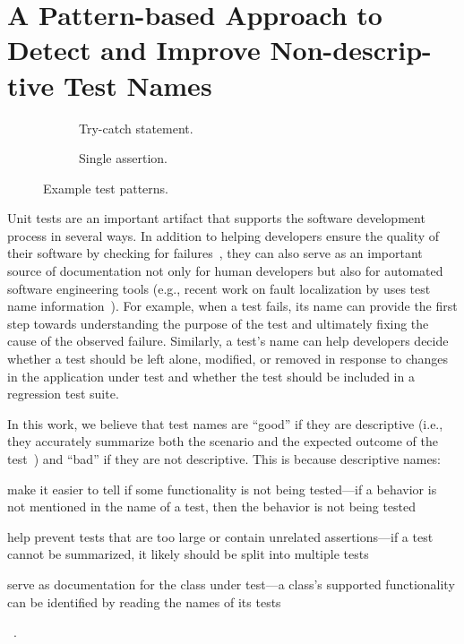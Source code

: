 \documentclass[proposal.tex]{subfiles}
\begin{document}
\section{A Pattern-based Approach to Detect and Improve Non-descrip-\\tive Test Names}
\label{sec:test-pattern}

\begin{figure}[t]
\centering
\begin{subfigure}{0.9\textwidth}
    \caption{Try-catch statement.}
    \label{PatternExample_tc}
\end{subfigure}
\begin{subfigure}{0.9\textwidth}
    \caption{Single assertion.}
    \label{PatternExample_allA}
\end{subfigure}
\caption{Example test patterns.}
\label{fig:example-patterns}
\end{figure}


Unit tests are an important artifact that supports the software development process in several ways.
In addition to helping developers ensure the quality of their software by checking for failures~\cite{daka2014survey}, they can also serve as an important source of documentation not only for human developers but also for automated software engineering tools (e.g., recent work on fault localization by \citeauthor{li2019deepfl} uses test name information~\cite{li2019deepfl}).
%
For example, when a test fails, its name can provide the first step towards understanding the purpose of the test and ultimately fixing the cause of the observed failure.
%
Similarly, a test's name can help developers decide whether a test should be left alone, modified, or removed in response to changes in the application under test and whether the test should be included in a regression test suite.


In this work, we believe that test names are \enquote{good} if they are descriptive (i.e., they accurately summarize both the scenario and the expected outcome of the test~\cite{trenk14}) and \enquote{bad} if they are not descriptive.
%
This is because descriptive names:
\begin{enumerate*}
\item make it easier to tell if some functionality is not being tested---if a behavior is not mentioned in the name of a test, then the behavior is not being tested
\item help prevent tests that are too large or contain unrelated assertions---if a test cannot be summarized, it likely should be split into multiple tests
\item serve as documentation for the class under test---a class's supported functionality can be identified by reading the names of its tests
\end{enumerate*}~\cite{zhang2015automatically}.
\end{document}
